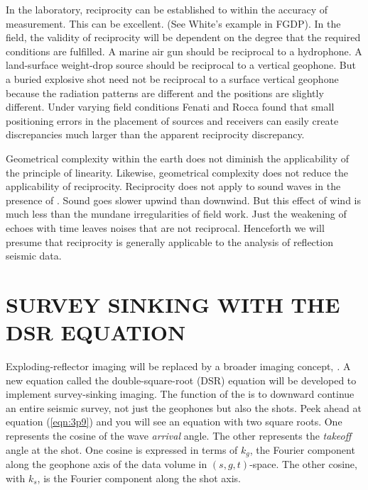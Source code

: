 \par
In the laboratory,
reciprocity can be established
to within the accuracy of measurement.
This can be excellent.
(See White's example in FGDP).
In the field,
the validity of reciprocity will be dependent on the degree
that the required conditions are fulfilled.
A marine air gun should be reciprocal to a hydrophone.
A land-surface weight-drop source should be reciprocal to a vertical geophone.
But a buried explosive shot need not be reciprocal to
a surface vertical geophone
because the radiation patterns are different
and the positions are slightly different.
Under varying field conditions Fenati and Rocca found
that small positioning errors
in the placement of sources and receivers
can easily create discrepancies
much larger than the apparent reciprocity discrepancy.

\par
Geometrical complexity within the earth
does not diminish the applicability of the principle of linearity.
Likewise,
geometrical complexity does not reduce the applicability of reciprocity.
Reciprocity does not apply to sound waves in the presence of .
Sound goes slower upwind than downwind.
But this effect of wind is much less than
the mundane irregularities of field work.
Just the weakening of echoes with time leaves noises that are not reciprocal.
Henceforth we will presume that reciprocity is generally applicable
to the analysis of reflection seismic data.

\section{SURVEY SINKING WITH THE DSR EQUATION}
\par
Exploding-reflector imaging will be replaced
by a broader imaging concept, 
{\em {}.}
A new equation called the
double-square-root (DSR) equation will be developed
to implement survey-sinking imaging. 
The function of the 
is to downward continue an entire seismic survey,
not just the geophones but also the shots.
Peek ahead at equation (\ref{eqn:3p9})
and you will see an equation with two square roots.
One represents the cosine of the wave
{\em  arrival}
angle.
The other represents the
{\em  takeoff}
angle at the shot.
One cosine is expressed in terms of  $k_g$, the Fourier component
along the geophone axis of the data volume in $(s,g,t)$-space.
The other cosine, with  $k_s$, is the Fourier component
along the shot axis.
